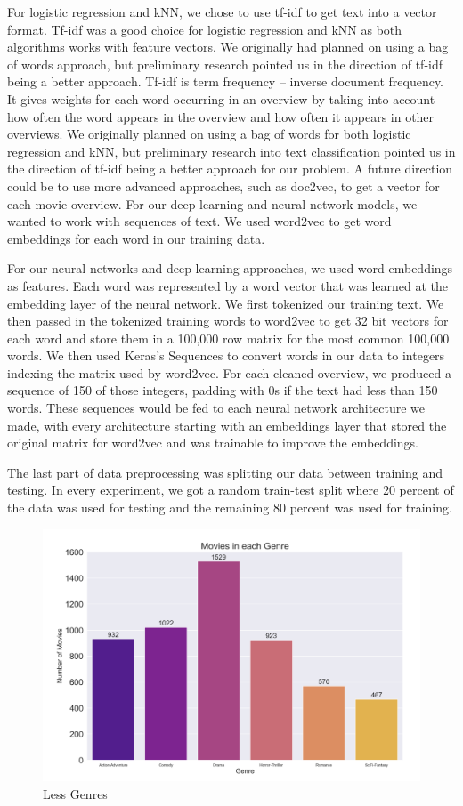 \documentclass[sigconf]{acmart}
\begin{document}
For logistic regression and kNN, we chose to use tf-idf to get text into a vector format. Tf-idf was a good choice for logistic regression and kNN as both algorithms works with feature vectors. We originally had planned on using a bag of words approach, but preliminary research pointed us in the direction of tf-idf being a better approach.
Tf-idf is term frequency -- inverse document frequency.  It gives weights for each word occurring in an overview by taking into account how often the word appears in the overview and how often it appears in other overviews. We originally planned on using a bag of words for both logistic regression and kNN, but preliminary research into text classification pointed us in the direction of tf-idf being a better approach for our problem.  A future direction could be to use more advanced approaches, such as doc2vec, to get a vector for each movie overview.  
For our deep learning and neural network models, we wanted to work with sequences of text.  We used word2vec to get word embeddings for each word in our training data.

For our neural networks and deep learning approaches, we used word embeddings as features.  Each word was represented by a word vector that was learned at the embedding layer of the neural network.  We first tokenized our training text. We then passed in the tokenized training words to word2vec to get 32 bit vectors for each word and store them in a 100,000 row matrix for the most common 100,000 words.  We then used Keras's Sequences to convert words in our data to integers indexing the matrix used by word2vec.  For each cleaned overview, we produced a sequence of 150 of those integers, padding with 0s if the text had less than 150 words. These sequences would be fed to each neural network architecture we made, with every architecture starting with an embeddings layer that stored the original matrix for word2vec and was trainable to improve the embeddings. 

The last part of data preprocessing was splitting our data between training and testing.  In every experiment, we got a random train-test split where 20 percent of the data was used for testing and the remaining 80 percent was used for training. 

\begin{figure}
	\includegraphics[width=\linewidth]{reduced_genres.png}
	\caption{Less Genres}
	\label{fig:less}
\end{figure}
\end{document}
